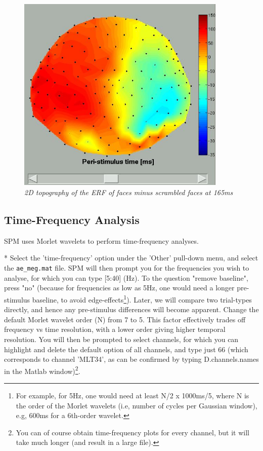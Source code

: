\begin{figure}
\begin{center}
\includegraphics[width=100mm]{multimodal/figures/figure_32_12}
\caption{\em 2D topography of the ERF of faces minus scrambled faces at 165ms\label{fig_32_12}}
\end{center}
\end{figure}

\subsection{Time-Frequency Analysis}

SPM uses Morlet wavelets to perform time-frequency analyses.

* Select the 'time-frequency' option under the 'Other' pull-down menu, and select the \verb!ae_meg.mat! file. SPM will then prompt you for the frequencies you wish to analyse, for which you can type [5:40] (Hz). To the question "remove baseline", press "no" (because for frequencies as low as 5Hz, one would need a longer pre-stimulus baseline, to avoid edge-effects\footnote{For example, for 5Hz, one would need at least N/2 x 1000ms/5, where N is the order of the Morlet wavelets (i.e, number of cycles per Gaussian window), e.g, 600ms for a 6th-order wavelet.}). Later, we will compare two trial-types directly, and hence any pre-stimulus differences will become apparent. Change the default Morlet wavelet order (N) from 7 to 5. This factor effectively trades off frequency vs time resolution, with a lower order giving higher temporal resolution. You will then be prompted to select channels, for which you can highlight and delete the default option of all channels, and type just 66 (which corresponds to channel 'MLT34', as can be confirmed by typing D.channels.names in the Matlab window)\footnote{You can of course obtain time-frequency plots for every channel, but it will take much longer (and result in a large file).}.

